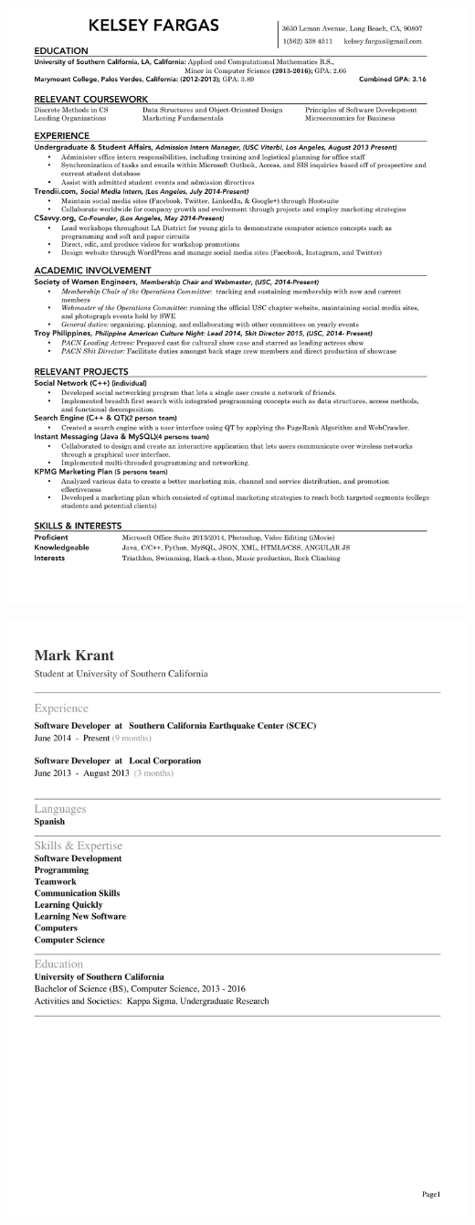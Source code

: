 \documentclass[]{article}
\begin{document}
\pagebreak

\includegraphics{kelsey.pdf}
\pagebreak

\pagebreak

\includegraphics{mark.pdf}
\pagebreak
\end{document}
